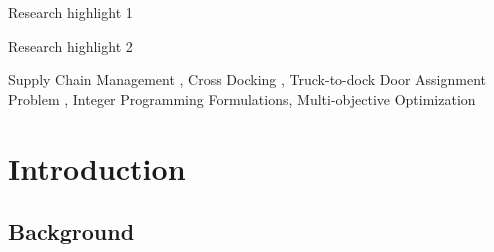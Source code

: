 \documentclass[preprint,12pt,authoryear]{elsarticle}
\begin{document}
\begin{frontmatter}
%
%

\begin{highlights}
\item Research highlight 1
\item Research highlight 2
\end{highlights}

%
%

\begin{keyword}



Supply Chain Management \sep
Cross Docking \sep
Truck-to-dock Door Assignment Problem \sep 
Integer Programming Formulations\sep
Multi-objective Optimization
\end{keyword}

\end{frontmatter}



\newpage
%
%
\section{Introduction} 
\label{sec:introduction}

%
%

\subsection{Background} %
\label{sec:Background}
\end{document}
